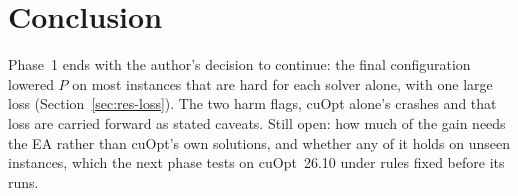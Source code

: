 \section{Conclusion}\label{sec:conclusion}
Phase~1 ends with the author's decision to continue: the final configuration lowered $P$ on most instances that are
hard for each solver alone, with one large loss (Section~\ref{sec:res-loss}). The two harm flags, cuOpt alone's crashes
and that loss are carried forward as stated caveats. Still open: how much of the gain needs the EA rather than cuOpt's
own solutions, and whether any of it holds on unseen instances, which the next phase tests on cuOpt~26.10 under rules
fixed before its runs.
\FloatBarrier
